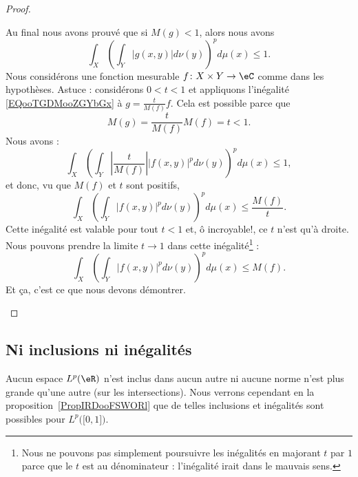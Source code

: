 \begin{proof}
\begin{subproof}
		Au final nous avons prouvé que si \( M(g)<1\), alors nous avons
		\begin{equation}        \label{EQooTGDMooZGYbGx}
			\int_X\left( \int_Y| g(x,y) |d\nu(y) \right)^pd\mu(x)\leq 1.
		\end{equation}
		Nous considérons une fonction mesurable \( f\colon X\times Y\to \eC\) comme dans les hypothèses. Astuce : considérons \( 0<t<1\) et appliquons l'inégalité \eqref{EQooTGDMooZGYbGx} à \( g=\frac{ t }{ M(f) }f\). Cela est possible parce que
		\begin{equation}
			M(g)=\frac{ t }{ M(f) }M(f)=t<1.
		\end{equation}
		Nous avons :
		\begin{equation}
			\int_X\left( \int_Y| \frac{ t }{ M(f) } | |f(x,y) |^pd\nu(y) \right)^pd\mu(x)\leq 1,
		\end{equation}
		et donc, vu que \( M(f)\) et \( t\) sont positifs,
		\begin{equation}
			\int_X\left( \int_Y| f(x,y) |^pd\nu(y) \right)^pd\mu(x)\leq \frac{ M(f) }{ t }.
		\end{equation}
		Cette inégalité est valable pour tout \( t<1\) et, ô incroyable!, ce \( t\) n'est qu'à droite. Nous pouvons prendre la limite \( t\to 1\) dans cette inégalité\footnote{Nous ne pouvons pas simplement poursuivre les inégalités en majorant \(  t\) par \(  1\) parce que le \(  t\) est au dénominateur : l'inégalité irait dans le mauvais sens.}  :
		\begin{equation}
			\int_X\left( \int_Y| f(x,y) |^pd\nu(y) \right)^pd\mu(x)\leq M(f).
		\end{equation}
		Et ça, c'est ce que nous devons démontrer.
	\end{subproof}

\end{proof}


\subsection{Ni inclusions ni inégalités}

Aucun espace \( L^p(\eR)\) n'est inclus dans aucun autre ni aucune norme n'est plus grande qu'une autre (sur les intersections). Nous verrons cependant en la proposition~\ref{PropIRDooFSWORl} que de telles inclusions et inégalités sont possibles pour \( L^p\big( \mathopen[ 0 , 1 \mathclose] \big)\).

